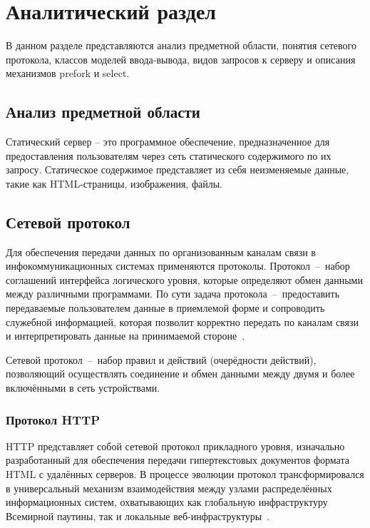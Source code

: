 \chapter{Аналитический раздел}

В данном разделе представляются анализ предметной области, понятия сетевого протокола, классов моделей ввода-вывода, видов запросов к серверу и описания механизмов prefork и select.

\section{Анализ предметной области}

Статический сервер -- это программное обеспечение, предназначенное для предоставления пользователям через сеть статического содержимого по их запросу. Статическое содержимое представляет из себя неизменяемые данные, такие как HTML-страницы, изображения, файлы.

\section{Сетевой протокол}

Для обеспечения передачи данных по организованным каналам связи в инфокоммуникационных системах применяются протоколы. Протокол~--~набор соглашений интерфейса логического уровня, которые определяют обмен данными между различными программами. По сути задача протокола~--~предоставить передаваемые пользователем данные в приемлемой форме и сопроводить служебной информацией, которая позволит корректно передать по каналам связи и интерпретировать данные на принимаемой стороне~\cite{tihomirova}. 

Сетевой протокол~--~набор правил и действий (очерёдности действий), позволяющий осуществлять соединение и обмен данными между двумя и более включёнными в сеть устройствами. 

\subsection{Протокол HTTP}

HTTP представляет собой сетевой протокол прикладного уровня, изначально разработанный для обеспечения передачи гипертекстовых документов формата HTML с удалённых серверов. В процессе эволюции протокол трансформировался в универсальный механизм взаимодействия между узлами распределённых информационных систем, охватывающих как глобальную инфраструктуру Всемирной паутины, так и локальные веб-инфраструктуры~\cite{bekasov}.

